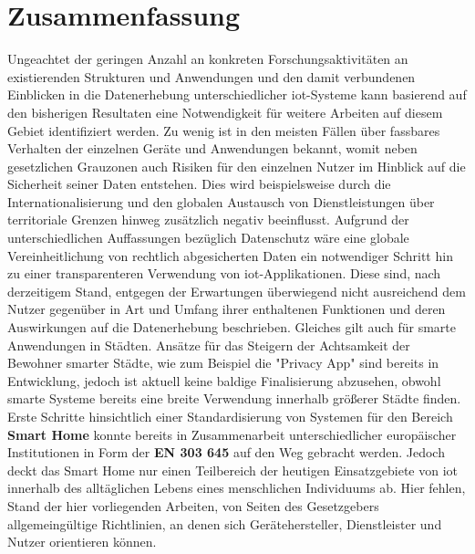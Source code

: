
\section{Zusammenfassung}
\label{sec:Zusammenfassung}
Ungeachtet der geringen Anzahl an konkreten Forschungsaktivitäten an existierenden Strukturen und Anwendungen und den damit verbundenen Einblicken in die Datenerhebung unterschiedlicher \ac{iot}-Systeme kann basierend auf den bisherigen Resultaten eine Notwendigkeit für weitere Arbeiten auf diesem Gebiet identifiziert werden. Zu wenig ist in den meisten Fällen über fassbares Verhalten der einzelnen Geräte und Anwendungen bekannt, womit neben gesetzlichen Grauzonen auch Risiken für den einzelnen Nutzer im Hinblick auf die Sicherheit seiner Daten entstehen. Dies wird beispielsweise durch die Internationalisierung und den globalen Austausch von Dienstleistungen über territoriale Grenzen hinweg zusätzlich negativ beeinflusst. Aufgrund der unterschiedlichen Auffassungen bezüglich Datenschutz wäre eine globale Vereinheitlichung von rechtlich abgesicherten Daten ein notwendiger Schritt hin zu einer transparenteren Verwendung von \ac{iot}-Applikationen.
Diese sind, nach derzeitigem Stand, entgegen der Erwartungen überwiegend nicht ausreichend dem Nutzer gegenüber in Art und Umfang ihrer enthaltenen Funktionen und deren Auswirkungen auf die Datenerhebung beschrieben. Gleiches gilt auch für smarte Anwendungen in Städten. Ansätze für das Steigern der Achtsamkeit der Bewohner smarter Städte, wie zum Beispiel die "Privacy App" \cite{EUIOTGDPR} sind bereits in Entwicklung, jedoch ist aktuell keine baldige Finalisierung abzusehen, obwohl smarte Systeme bereits eine breite Verwendung innerhalb größerer Städte finden.
Erste Schritte hinsichtlich einer Standardisierung von Systemen für den Bereich \textbf{Smart Home} konnte bereits in Zusammenarbeit unterschiedlicher europäischer Institutionen in Form der \textbf{EN 303 645} \cite{ETSI2020} auf den Weg gebracht werden. Jedoch deckt das Smart Home nur einen Teilbereich der heutigen Einsatzgebiete von \ac{iot} innerhalb des alltäglichen Lebens eines menschlichen Individuums ab. Hier fehlen, Stand der hier vorliegenden Arbeiten, von Seiten des Gesetzgebers allgemeingültige Richtlinien, an denen sich Gerätehersteller, Dienstleister und Nutzer orientieren können.
